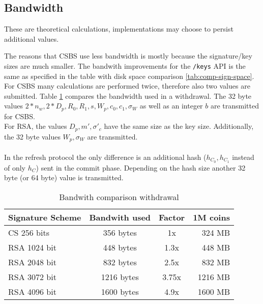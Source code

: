 \subsection{Bandwidth}
\begin{bfhWarnBox}
    These are theoretical calculations, implementations may choose to persist additional values.
\end{bfhWarnBox}
The reasons that \gls{CSBS} use less bandwidth is mostly because the signature/key sizes are much smaller.
The bandwith improvements for the \texttt{/keys} API is the same as specified in the table with disk space comparison \ref{tab:comp-sign-space}.
For \gls{CSBS} many calculations are performed twice, therefore also two values are submitted.
Table \ref{tab:comp-band-withd} compares the bandwidth used in a withdrawal.
The 32 byte values $2 * n_w, 2 * D_p, R_0, R_1, s,W_p, c_0, c_1, \sigma_W$ as well as an integer $b$ are transmitted for \gls{CSBS}.\\
For RSA, the values $D_p, m', \sigma'_c$ have the same size as the key size.
Additionally, the 32 byte values $W_p, \sigma_W$ are transmitted.
\\\\
In the refresh protocol the only difference is an additional hash ($h_{C_0}, h_{C_1}$ instead of only $h_C$) sent in the commit phase.
Depending on the hash size another 32 byte (or 64 byte) value is transmitted.

\begin{table}[ht]
    \centering
    \setupBfhTabular
    \begin{tabular}{lccr}
        \rowcolor{BFH-tablehead}
        \textbf{Signature Scheme} & \textbf{Bandwith used} & \textbf{Factor} & \textbf{1M coins}\\\hline
        CS 256 bits & 356 bytes & 1x & 324 MB\\\hline
        RSA 1024 bit & 448 bytes & 1.3x & 448 MB \\\hline
        RSA 2048 bit & 832 bytes & 2.5x & 832 MB\\\hline
        RSA 3072 bit & 1216 bytes & 3.75x & 1216 MB\\\hline
        RSA 4096 bit & 1600 bytes & 4.9x & 1600 MB\\\hline
    \end{tabular}
    \caption{Bandwith comparison withdrawal}
    \label{tab:comp-band-withd}
\end{table}

